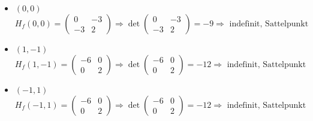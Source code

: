 \documentclass[10pt,a4paper,parskip=half]{scrartcl}
\begin{document}
	\begin{itemize}
		\item 	$(0,0)$
			\[H_f(0,0) = 
			\begin{pmatrix}
				0 & -3 \\
				-3 & 2		
			\end{pmatrix} \Rightarrow 
			\det \begin{pmatrix}
				0 & -3 \\
				-3 & 2		
			\end{pmatrix} = -9 \Rightarrow \text{ indefinit, Sattelpunkt}\]
		\item 	$(1,-1)$
			\[H_f(1,-1) = 
			\begin{pmatrix}
				-6 & 0 \\
				0 & 2		
			\end{pmatrix} \Rightarrow 
			\det \begin{pmatrix}
				-6 & 0 \\
				0 & 2		
			\end{pmatrix} = -12 \Rightarrow \text{ indefinit, Sattelpunkt}\]
		\item  	$(-1,1)$
			\[H_f(-1,1) = 
			\begin{pmatrix}
				-6 & 0 \\
				0 & 2		
			\end{pmatrix} \Rightarrow 
			\det \begin{pmatrix}
				-6 & 0 \\
				0 & 2		
			\end{pmatrix} = -12 \Rightarrow \text{ indefinit, Sattelpunkt}\]
	\end{itemize}	
\end{document}
